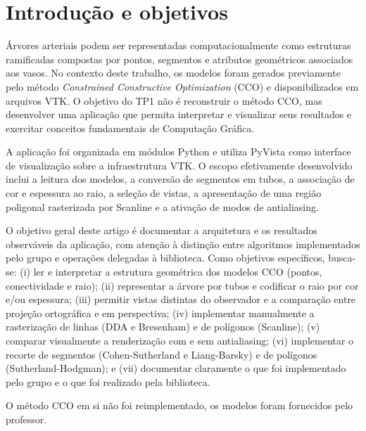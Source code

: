 \section{Introdução e objetivos}

Árvores arteriais podem ser representadas computacionalmente como estruturas ramificadas compostas por pontos, segmentos e atributos geométricos associados aos vasos. No contexto deste trabalho, os modelos foram gerados previamente pelo método \emph{Constrained Constructive Optimization} (CCO) e disponibilizados em arquivos VTK. O objetivo do TP1 não é reconstruir o método CCO, mas desenvolver uma aplicação que permita interpretar e visualizar seus resultados e exercitar conceitos fundamentais de Computação Gráfica.

A aplicação foi organizada em módulos Python e utiliza PyVista como interface de visualização sobre a infraestrutura VTK. O escopo efetivamente desenvolvido inclui a leitura dos modelos, a conversão de segmentos em tubos, a associação de cor e espessura ao raio, a seleção de vistas, a apresentação de uma região poligonal rasterizada por Scanline e a ativação de modos de antialiasing.

O objetivo geral deste artigo é documentar a arquitetura e os resultados observáveis da aplicação, com atenção à distinção entre algoritmos implementados pelo grupo e operações delegadas à biblioteca. Como objetivos específicos, busca-se: (i) ler e interpretar a estrutura geométrica dos modelos CCO (pontos, conectividade e raio); (ii) representar a árvore por tubos e codificar o raio por cor e/ou espessura; (iii) permitir vistas distintas do observador e a comparação entre projeção ortográfica e em perspectiva; (iv) implementar manualmente a rasterização de linhas (DDA e Bresenham) e de polígonos (Scanline); (v) comparar visualmente a renderização com e sem antialiasing; (vi) implementar o recorte de segmentos (Cohen-Sutherland e Liang-Barsky) e de polígonos (Sutherland-Hodgman); e (vii) documentar claramente o que foi implementado pelo grupo e o que foi realizado pela biblioteca.

O método CCO em si não foi reimplementado, os modelos foram fornecidos pelo professor.
